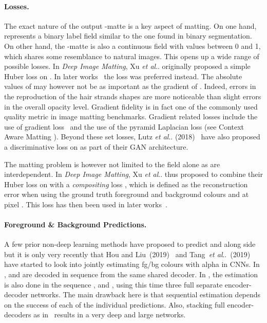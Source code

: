 \documentclass[runningheads]{llncs}
\makeatletter
\DeclareRobustCommand\onedot{\futurelet\@let@token\@onedot}
\def\@onedot{\ifx\@let@token.\else.\null\fi\xspace}
\def\etal{\emph{et al}\onedot}
\makeatother
\begin{document}
\paragraph{Losses.}

The exact nature of the output -matte is a key aspect of matting. On one
hand,  represents a binary label field similar to the one found
in binary segmentation. On other hand, the -matte is also a continuous
field with values between 0 and 1, which shares some resemblance to natural
images. This opens up a wide range of possible losses. In \textit{Deep Image
  Matting}, Xu \etal\cite{DeepImageMatting} originally proposed a simple Huber
loss on . In later works~\cite{DisentangledMatting,ContextMatting,GCAMatting} the  loss was
preferred instead. The absolute values of  may however not be as
important as the gradient of . Indeed, errors in the reproduction of the
hair strands shapes are more noticeable than slight errors in the overall
opacity level. Gradient fidelity is in fact one of the commonly used quality
metric in image matting benchmarks. Gradient related losses include the use of
 gradient loss~\cite{LearningBasedSamplingMatting} and the use of the pyramid Laplacian loss (see Context
Aware Matting \cite{ContextMatting}). Beyond these set losses, Lutz \etal
(2018)~\cite{AlphaGAN} have also proposed a discriminative loss on  as
part of their GAN architecture.

The matting problem is however not limited to the  field alone as
 are interdependent. In \textit{Deep Image Matting}, Xu
\etal\cite{DeepImageMatting} thus proposed to combine their Huber loss on
 with a \textit{compositing} loss , which is defined as the
reconstruction error  when using the ground truth foreground and
background colours  and  at pixel . This loss has then
been used in later works~\cite{AlphaGAN,LearningBasedSamplingMatting,VDRNMatting}. 
\paragraph{Foreground \& Background Predictions.}

A few prior non-deep learning methods have proposed to predict  and
 along side ~\cite{SimultaneousMatting,sharedMatting,IfmMatting} but it
is only very recently that Hou and Liu~(2019)~\cite{ContextMatting} and
Tang~\etal~(2019)~\cite{LearningBasedSamplingMatting} have started to look into
jointly estimating fg/bg colours with alpha in CNNs. In \cite{ContextMatting},
  and  are decoded in sequence from the same shared decoder. In
\cite{LearningBasedSamplingMatting}, the estimation is also done in the sequence
,  and , using this time three full separate encoder-decoder
networks. The main drawback here is that sequential estimation
depends on the success of each of the individual predictions. Also, stacking
full encoder-decoders as in~\cite{LearningBasedSamplingMatting} results in a
very deep and large networks.
\end{document}
